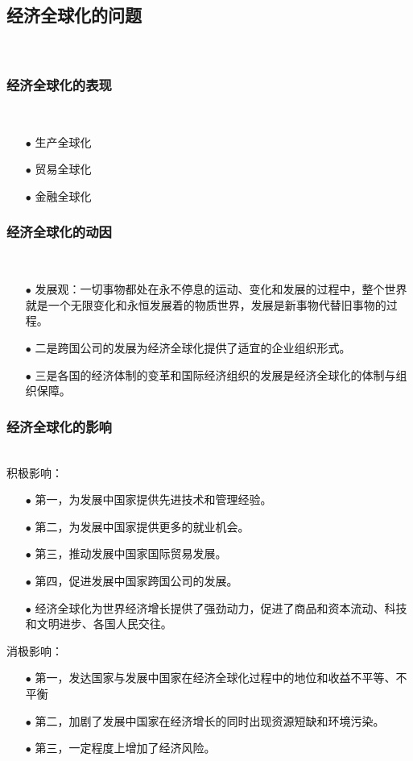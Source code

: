 \documentclass{ctexart}
\begin{document}
\subsection{经济全球化的问题}~{}
\vspace{-5mm}

\subsubsection{经济全球化的表现}~{}
\vspace{-5mm}
\begin{itemize}
\item[$\bullet$]生产全球化
\item[$\bullet$]贸易全球化
\item[$\bullet$]金融全球化
\end{itemize}

\subsubsection{经济全球化的动因}~{}
\vspace{-5mm}
\begin{itemize}
\item[$\bullet$]发展观：一切事物都处在永不停息的运动、变化和发展的过程中，整个世界就是一个无限变化和永恒发展着的物质世界，发展是新事物代替旧事物的过程。
\item[$\bullet$]二是跨国公司的发展为经济全球化提供了适宜的企业组织形式。
\item[$\bullet$]三是各国的经济体制的变革和国际经济组织的发展是经济全球化的体制与组织保障。
\end{itemize}


\subsubsection{经济全球化的影响}~{}
\vspace{-5mm}
\\
积极影响：
\begin{itemize}
\item[$\bullet$]第一，为发展中国家提供先进技术和管理经验。
\item[$\bullet$]第二，为发展中国家提供更多的就业机会。
\item[$\bullet$]第三，推动发展中国家国际贸易发展。
\item[$\bullet$]第四，促进发展中国家跨国公司的发展。
\item[$\bullet$]经济全球化为世界经济增长提供了强劲动力，促进了商品和资本流动、科技和文明进步、各国人民交往。
\end{itemize}
消极影响：
\begin{itemize}
    \item[$\bullet$]第一，发达国家与发展中国家在经济全球化过程中的地位和收益不平等、不平衡
    \item[$\bullet$]第二，加剧了发展中国家在经济增长的同时出现资源短缺和环境污染。
    \item[$\bullet$]第三，一定程度上增加了经济风险。
    \end{itemize}
\end{document}
